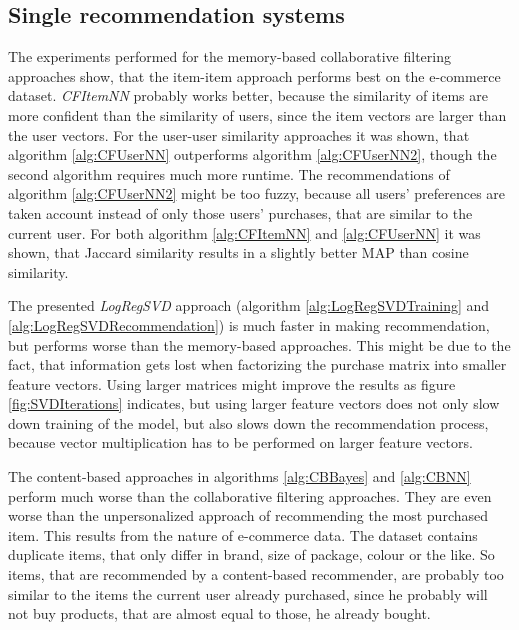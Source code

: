 \documentclass[10pt]{reportMaster}
\begin{document}
\subsection{Single recommendation systems}
\label{sec:discSingleRecommendationSystems}
The experiments performed for the memory-based collaborative filtering approaches show, that the item-item approach performs best on the e-commerce dataset.
\textit{CFItemNN} probably works better, because the similarity of items are more confident than the similarity of users, since the item vectors are larger than the user vectors.
For the user-user similarity approaches it was shown, that algorithm \ref{alg:CFUserNN} outperforms algorithm \ref{alg:CFUserNN2}, though the second algorithm requires much more runtime.
The recommendations of algorithm \ref{alg:CFUserNN2} might be too fuzzy, because all users' preferences are taken account instead of only those users' purchases, that are similar to the current user.
For both algorithm \ref{alg:CFItemNN} and \ref{alg:CFUserNN} it was shown, that Jaccard similarity results in a slightly better MAP than cosine similarity.

The presented \textit{LogRegSVD} approach (algorithm \ref{alg:LogRegSVDTraining} and \ref{alg:LogRegSVDRecommendation}) is much faster in making recommendation, but performs worse than the memory-based approaches.
This might be due to the fact, that information gets lost when factorizing the purchase matrix into smaller feature vectors.
Using larger matrices might improve the results as figure \ref{fig:SVDIterations} indicates, but using larger feature vectors does not only slow down training of the model, but also slows down the recommendation process, because vector multiplication has to be performed on larger feature vectors.

The content-based approaches in algorithms \ref{alg:CBBayes} and \ref{alg:CBNN} perform much worse than the collaborative filtering approaches.
They are even worse than the unpersonalized approach of recommending the most purchased item.
This results from the nature of e-commerce data.
The dataset contains duplicate items, that only differ in brand, size of package, colour or the like.
So items, that are recommended by a content-based recommender, are probably too similar to the items the current user already purchased, since he probably will not buy products, that are almost equal to those, he already bought.
\end{document}
